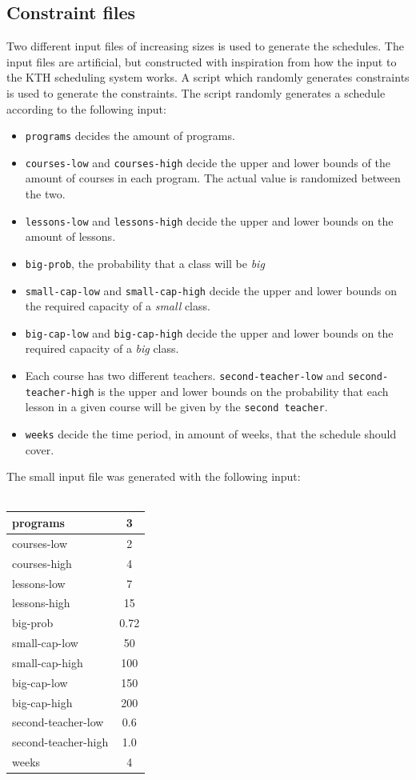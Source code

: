 \documentclass[titlepage,a4paper]{article}
\begin{document}
\subsection{Constraint files}
Two different input files of increasing sizes is used to generate the schedules. The input files are artificial, but constructed with inspiration from how the input to the KTH scheduling system works.
A script which randomly generates constraints is used to generate the constraints. The script randomly generates a schedule according to the following input:
\begin{itemize}
  \item \texttt{programs} decides the amount of programs.
  \item \texttt{courses-low} and \texttt{courses-high} decide the upper and lower bounds of the amount of courses in each program. The actual value is randomized between the two.
  \item \texttt{lessons-low} and \texttt{lessons-high} decide the upper and lower bounds on the amount of lessons.
  \item \texttt{big-prob}, the probability that a class will be \emph{big}
  \item \texttt{small-cap-low} and \texttt{small-cap-high} decide the upper and lower bounds on the required capacity of a \emph{small} class.
  \item \texttt{big-cap-low} and \texttt{big-cap-high} decide the upper and lower bounds on the required capacity of a \emph{big} class.
  \item Each course has two different teachers. \texttt{second-teacher-low} and \texttt{second-teacher-high} is the upper and lower bounds on the probability that each lesson in a given course will be given by the \texttt{second teacher}.
  \item \texttt{weeks} decide the time period, in amount of weeks, that the schedule should cover.
\end{itemize} 
The small input file was generated with the following input: \\\\
\medskip
\begin{tabular}{| l | c |}
  \hline
  programs & 3 \\
  \hline
  courses-low & 2 \\
  \hline
  courses-high & 4 \\
  \hline
  lessons-low & 7 \\
  \hline  
  lessons-high & 15 \\
  \hline  
  big-prob & 0.72 \\
  \hline  
  small-cap-low & 50 \\
  \hline  
  small-cap-high & 100 \\
  \hline  
  big-cap-low & 150 \\
  \hline  
  big-cap-high & 200 \\
  \hline  
  second-teacher-low & 0.6 \\
  \hline  
  second-teacher-high & 1.0 \\
  \hline
  weeks & 4 \\
  \hline
\end{tabular}
\end{document}
